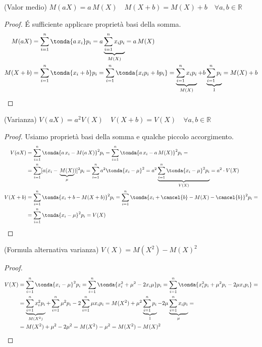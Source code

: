 \begin{proprieta} (Valor medio) \quad $\boxed{M(aX) = a\, M(X)}  \quad \boxed{M(X+b) = M(X)+b} \quad \forall a,b \in \mathbb{R}$
 \end{proprieta}
 \begin{proof}
\'E sufficiente applicare proprietà basi della somma.\\
 \[\begin{split}M(aX)&= \sum_{i=1}^n \tonda{a \, x_i } p_i = a \underbrace{\sum_{i=1}^n x_i p_i}_{M(X)} = a \, M(X) \\ 
 M(X+b) &= \sum_{i=1}^n \tonda{x_i+b} p_i = \sum_{i=1}^n \tonda{x_i p_i+b p_i} = \underbrace{\sum_{i=1}^n x_i p_i}_{M(X)} +b  \underbrace{\sum_{i=1}^n p_i}_{1} = M(X)+b\end{split}\]
 \end{proof}
 
  \begin{proprieta} (Varianza) \quad $\boxed{V(aX) = a^2 V(X)} \quad \boxed{V(X+b) = V(X)} \quad \forall a,b \in \mathbb{R}$
 \end{proprieta}
 \begin{proof}
 Usiamo proprietà basi della somma e qualche piccolo accorgimento.\\
 \[\begin{split}V(aX)&= \sum_{i=1}^n \tonda{a \,x_i-M(a\,X)}^2 p_i = \sum_{i=1}^n \tonda{a\,x_i-a\,M(X)}^2 p_i =\\&=  \sum_{i=1}^n [a (x_i-\,\underbrace{M(X)}_{\mu})]^2 p_i =\sum_{i=1}^n a^2 \tonda{x_i-\mu}^2 = a^2 \underbrace{\sum_{i=1}^n \tonda{x_i-\mu}^2 p_i }_{V(X)}= a^2 \cdot V(X) \\
 V(X+b) &= \sum_{i=1}^n \tonda{x_i+b-M(X+b)}^2 p_i = \sum_{i=1}^n \tonda{x_i+\cancel{b}-M(X)-\cancel{b}}^2 p_i = \\ &=\sum_{i=1}^n \tonda{x_i-\mu}^2 p_i = V(X) \end{split}\]
 \end{proof}
 
   \begin{proprieta} (Formula alternativa varianza) \quad $V(X) = M(X^2)-M(X)^2$
 \end{proprieta}
 \begin{proof}
  \[\begin{split} V(X) &= \sum_{i=1}^n \tonda{x_i-\mu}^2 p_i = \sum_{i=1}^n \tonda{x_i^2+\mu^2-2x_i \mu} p_i =\sum_{i=1}^n \tonda{x_i^2 p_i + \mu^2 p_i - 2 \mu x_i p_i}=\\ &= \underbrace{\sum_{i=1}^n x_i^2 p_i}_{M(X^2)} + \sum_{i=1}^n \mu^2 p_i - 2 \sum_{i=1}^n \mu x_i p_i = M(X^2)+\mu^2 \underbrace{\sum_{i=1}^n p_i}_{1}-2 \mu \underbrace{\sum_{i=1}^n x_i p_i}_{\mu}=\\&=
  M(X^2)+\mu^2-2\mu^2 = M(X^2)-\mu^2 = M(X^2)-M(X)^2 \end{split}\]
 \end{proof}
 

